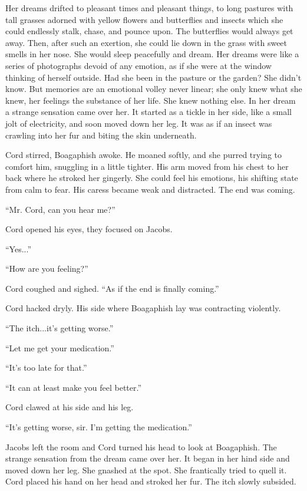 Her dreams drifted to pleasant times and pleasant things, to long
pastures with tall grasses adorned with yellow flowers and butterflies
and insects which she could endlessly stalk, chase, and pounce upon. The
butterflies would always get away. Then, after such an exertion, she
could lie down in the grass with sweet smells in her nose. She would
sleep peacefully and dream. Her dreams were like a series of photographs
devoid of any emotion, as if she were at the window thinking of herself
outside. Had she been in the pasture or the garden? She didn't know. But
memories are an emotional volley never linear; she only knew what she
knew, her feelings the substance of her life. She knew nothing else. In
her dream a strange sensation came over her. It started as a tickle in
her side, like a small jolt of electricity, and soon moved down her leg.
It was as if an insect was crawling into her fur and biting the skin
underneath.

Cord stirred, Boagaphish awoke. He moaned softly, and she purred trying
to comfort him, snuggling in a little tighter. His arm moved from his
chest to her back where he stroked her gingerly. She could feel his
emotions, his shifting state from calm to fear. His caress became weak
and distracted. The end was coming.

``Mr. Cord, can you hear me?''

Cord opened his eyes, they focused on Jacobs.

``Yes...''

``How are you feeling?''

Cord coughed and sighed. ``As if the end is finally coming.''

Cord hacked dryly. His side where Boagaphish lay was contracting
violently.

``The itch...it's getting worse.''

``Let me get your medication.''

``It's too late for that.''

``It can at least make you feel better.''

Cord clawed at his side and his leg.

``It's getting worse, sir. I'm getting the medication.''

Jacobs left the room and Cord turned his head to look at Boagaphish. The
strange sensation from the dream came over her. It began in her hind
side and moved down her leg. She gnashed at the spot. She frantically
tried to quell it. Cord placed his hand on her head and stroked her fur.
The itch slowly subsided.

